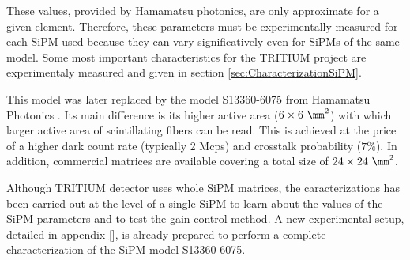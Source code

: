 These values, provided by Hamamatsu photonics, are only approximate for a given element. Therefore, these parameters must be experimentally measured for each SiPM used because they can vary significatively even for SiPMs of the same model. Some most important characteristics for the TRITIUM project are experimentaly measured and given in section \ref{sec:CharacterizationSiPM}. 

This model was later replaced by the model S13360-6075 from Hamamatsu Photonics \cite{DataSheetHammamatsu_1_SiPM_75}. Its main difference is its higher active area ($6\times6~\mm^2$) with which larger active area of scintillating fibers can be read. This is achieved at the price of a higher dark count rate (typically 2 Mcps) and crosstalk probability ($7\%$). In addition, commercial matrices are available covering a total size of $24\times24~\mm^2$.

Although TRITIUM detector uses whole SiPM matrices, the caracterizations has been carried out at the level of a single SiPM to learn about the values of the SiPM parameters and to test the gain control method. A new experimental setup, detailed in appendix \ref{}, is already  prepared to perform a complete characterization of the SiPM model S13360-6075.